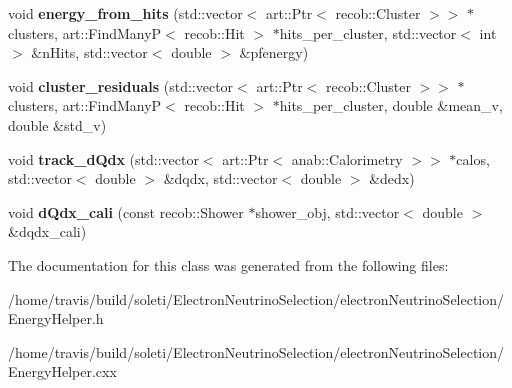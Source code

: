 \begin{DoxyCompactItemize}
\item 
\hypertarget{classlee_1_1EnergyHelper_a682a97a35bf38e4ef2e4b38732719dcd}{void {\bfseries energy\-\_\-from\-\_\-hits} (std\-::vector$<$ art\-::\-Ptr$<$ recob\-::\-Cluster $>$$>$ $\ast$clusters, art\-::\-Find\-Many\-P$<$ recob\-::\-Hit $>$ $\ast$hits\-\_\-per\-\_\-cluster, std\-::vector$<$ int $>$ \&n\-Hits, std\-::vector$<$ double $>$ \&pfenergy)}\label{classlee_1_1EnergyHelper_a682a97a35bf38e4ef2e4b38732719dcd}

\item 
\hypertarget{classlee_1_1EnergyHelper_ae55ba831390287b749641b84b1be7e0d}{void {\bfseries cluster\-\_\-residuals} (std\-::vector$<$ art\-::\-Ptr$<$ recob\-::\-Cluster $>$$>$ $\ast$clusters, art\-::\-Find\-Many\-P$<$ recob\-::\-Hit $>$ $\ast$hits\-\_\-per\-\_\-cluster, double \&mean\-\_\-v, double \&std\-\_\-v)}\label{classlee_1_1EnergyHelper_ae55ba831390287b749641b84b1be7e0d}

\item 
\hypertarget{classlee_1_1EnergyHelper_a5698af14612035f672a852041d067f9d}{void {\bfseries track\-\_\-d\-Qdx} (std\-::vector$<$ art\-::\-Ptr$<$ anab\-::\-Calorimetry $>$$>$ $\ast$calos, std\-::vector$<$ double $>$ \&dqdx, std\-::vector$<$ double $>$ \&dedx)}\label{classlee_1_1EnergyHelper_a5698af14612035f672a852041d067f9d}

\item 
\hypertarget{classlee_1_1EnergyHelper_ad730a5ca3f5d4df30ee4aebb8f877e2f}{void {\bfseries d\-Qdx\-\_\-cali} (const recob\-::\-Shower $\ast$shower\-\_\-obj, std\-::vector$<$ double $>$ \&dqdx\-\_\-cali)}\label{classlee_1_1EnergyHelper_ad730a5ca3f5d4df30ee4aebb8f877e2f}

\end{DoxyCompactItemize}


The documentation for this class was generated from the following files\-:\begin{DoxyCompactItemize}
\item 
/home/travis/build/soleti/\-Electron\-Neutrino\-Selection/electron\-Neutrino\-Selection/Energy\-Helper.\-h\item 
/home/travis/build/soleti/\-Electron\-Neutrino\-Selection/electron\-Neutrino\-Selection/Energy\-Helper.\-cxx\end{DoxyCompactItemize}
